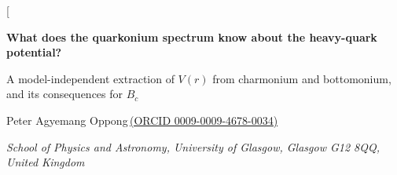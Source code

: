 \documentclass[10pt,twocolumn]{article}
\newcommand{\Bc}{B_c}
\begin{document}
\twocolumn[
\begin{@twocolumnfalse}
\begin{center}
{\LARGE\bfseries What does the quarkonium spectrum know about the heavy-quark potential?}

\vspace{2pt}
{\large A model-independent extraction of $V(r)$ from charmonium and bottomonium, and its consequences for $\Bc$}

\vspace{10pt}
{\large Peter Agyemang Oppong\,\href{https://orcid.org/0009-0009-4678-0034}{\small(ORCID 0009-0009-4678-0034)}}

\vspace{2pt}
{\small\itshape School of Physics and Astronomy, University of Glasgow, Glasgow G12 8QQ, United Kingdom}


\end{center}
\end{@twocolumnfalse}
\end{document}

